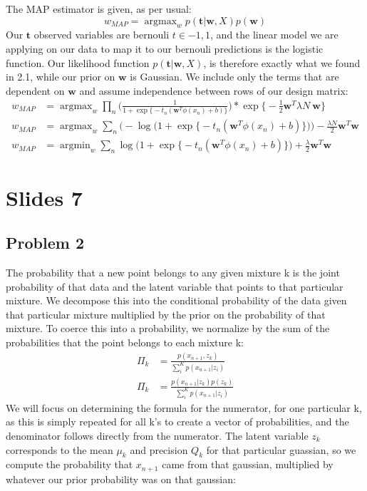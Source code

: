 \documentclass[a4paper,12pt]{article}
\DeclareMathOperator*{\argmin}{argmin}
\DeclareMathOperator*{\argmax}{argmax}
\begin{document}
The MAP estimator is given, as per usual:
%
$$
w_{MAP} = \argmax_w p( \bm{t} | \bm{w}, X)p(\bm{w})
$$
%
Our $\bm{t}$ observed variables are bernouli $t \in {-1,1}$, and the linear model we are applying on our data to map it to our bernouli predictions is the logistic function. Our likelihood function $ p( \bm{t} | \bm{w}, X) $, is therefore exactly what we found in 2.1, while our prior on $\bm{w}$ is Gaussian. We include only the terms that are dependent on $\bm{w}$ and assume independence between rows of our design matrix:
%
\begin{align*}
w_{MAP} &= \argmax_w \prod_n \Bigg( \frac{1}{1 + \exp\Big\{ -t_n(\bm{w}^T{\phi}(x_n) + b)  \Big\} } \Bigg) * \exp \Big\{ -\frac{1}{2}\bm{w}^T \lambda N\ \bm{w} \Big\} \\
w_{MAP} &= \argmax_w \sum_n \Big( - \log \Big( 1 + \exp\Big\{  -t_n(\bm{w}^T{\phi}(x_n) + b)  \Big\} \Big)\Big) - \frac{\lambda N}{2}\bm{w}^T \bm{w} \\
w_{MAP} &= \argmin_w \sum_n \log \Big( 1 + \exp\Big\{ -t_n(\bm{w}^T{\phi}(x_n) + b)  \Big\} \Big) + \frac{\lambda }{2} \bm{w}^T \bm{w}
\end{align*}
%

\section*{Slides 7}

\subsection*{Problem 2}

The probability that a new point belongs to any given mixture k is the joint probability of that data and the latent variable that points to that particular mixture. We decompose this into the conditional probability of the data given that particular mixture multiplied by the prior on the probability of that mixture. To coerce this into a probability, we normalize by the sum of the probabilities that the point belongs to each mixture k:
%
\begin{align*}
\Pi_k &= \frac{p(x_{n+1}, z_k)}{\sum_i^K p(x_{n+1} | z_i)} \\
\Pi_k &= \frac{p(x_{n+1} | z_k)p(z_k)}{\sum_i^K p(x_{n+1} | z_i)}
\end{align*}
%
We will focus on determining the formula for the numerator, for one particular k, as this is simply repeated for all k's to create a vector of probabilities, and the denominator follows directly from the numerator. The latent variable $z_k$ corresponds to the mean $\mu_k$ and precision $Q_k$ for that particular guassian, so we compute the probability that $x_{n+1}$ came from that gaussian, multiplied by whatever our prior probability was on that gaussian:
\end{document}
